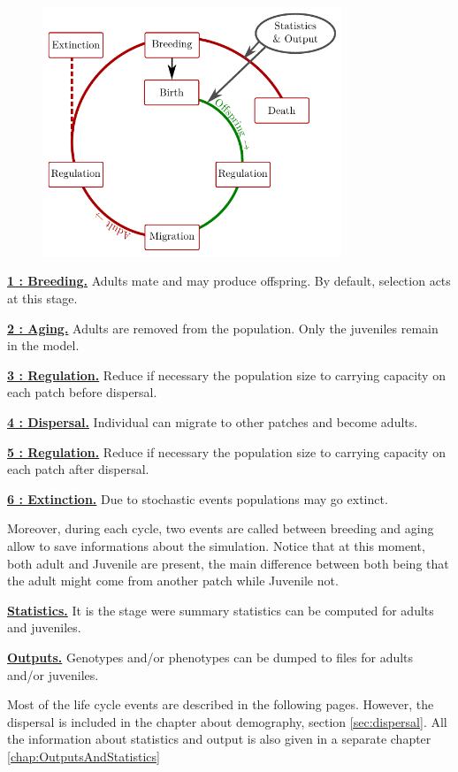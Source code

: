 \documentclass[letterpaper,12pt,oneside]{book}
\begin{document}
\begin{figure}[h]
	\centering
		\includegraphics[width=0.80\textwidth]{life_cycle.pdf}
	\label{fig:life-cycle}
\end{figure}
\begin{description}
\item \textbf{\hyperref[chap:breeding]{1 : Breeding.}} Adults mate and may produce offspring. By default, selection acts at this stage.
\item \textbf{\hyperref[4aging]{2 : Aging.}} Adults are removed from the population. Only the juveniles remain in the model.
\item \textbf{\hyperref[5regulation]{3 : Regulation.}} Reduce if necessary the population size to carrying capacity on each patch before dispersal. 
\item \textbf{\hyperref[sec:dispersal]{4 : Dispersal.}} Individual can migrate to other patches and become adults. 
\item \textbf{\hyperref[7regulation]{5 : Regulation.}} Reduce if necessary the population size to carrying capacity on each patch after dispersal. 
\item \textbf{\hyperref[8extinction]{6 : Extinction.}} Due to stochastic events populations may go extinct.
\end{description}
Moreover, during each cycle,  two events are called between breeding and aging allow to save informations about the simulation.  Notice that at this moment, both adult and Juvenile are present, the main difference between both being that the adult might come from another patch while Juvenile not. 
\begin{description}
\item \textbf{\hyperref[sec:Statistics]{Statistics.}} It is the stage were summary statistics can be computed for adults and juveniles.
\item \textbf{\hyperref[sec:Output]{Outputs.}} Genotypes and/or phenotypes can be dumped to files for adults and/or juveniles.
\end{description}
Most of the life cycle events are described in the following pages. However, the dispersal is included in the chapter about demography,  section \ref{sec:dispersal}. All the information about statistics and output is also given in a separate chapter \ref{chap:OutputsAndStatistics}
\end{document}
